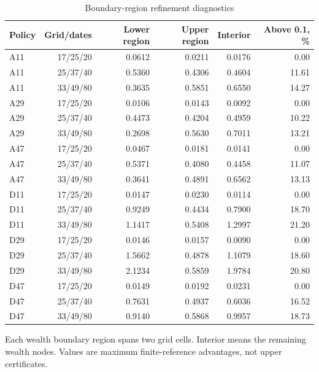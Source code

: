 \begin{table}[htbp]
\centering\small\setlength{\tabcolsep}{4pt}
\caption{Boundary-region refinement diagnostics}\label{tab:r9boundary}
\begin{tabular}{lrrrrr}
\toprule
Policy & Grid/dates & Lower region & Upper region & Interior & Above 0.1, \% \\
\midrule
A11 & 17/25/20 & 0.0612 & 0.0211 & 0.0176 & 0.00 \\
A11 & 25/37/40 & 0.5360 & 0.4306 & 0.4604 & 11.61 \\
A11 & 33/49/80 & 0.3635 & 0.5851 & 0.6550 & 14.27 \\
A29 & 17/25/20 & 0.0106 & 0.0143 & 0.0092 & 0.00 \\
A29 & 25/37/40 & 0.4473 & 0.4204 & 0.4959 & 10.22 \\
A29 & 33/49/80 & 0.2698 & 0.5630 & 0.7011 & 13.21 \\
A47 & 17/25/20 & 0.0467 & 0.0181 & 0.0141 & 0.00 \\
A47 & 25/37/40 & 0.5371 & 0.4080 & 0.4458 & 11.07 \\
A47 & 33/49/80 & 0.3641 & 0.4891 & 0.6562 & 13.13 \\
D11 & 17/25/20 & 0.0147 & 0.0230 & 0.0114 & 0.00 \\
D11 & 25/37/40 & 0.9249 & 0.4434 & 0.7900 & 18.70 \\
D11 & 33/49/80 & 1.1417 & 0.5408 & 1.2997 & 21.20 \\
D29 & 17/25/20 & 0.0146 & 0.0157 & 0.0090 & 0.00 \\
D29 & 25/37/40 & 1.5662 & 0.4878 & 1.1079 & 18.60 \\
D29 & 33/49/80 & 2.1234 & 0.5859 & 1.9784 & 20.80 \\
D47 & 17/25/20 & 0.0149 & 0.0192 & 0.0231 & 0.00 \\
D47 & 25/37/40 & 0.7631 & 0.4937 & 0.6036 & 16.52 \\
D47 & 33/49/80 & 0.9140 & 0.5868 & 0.9957 & 18.73 \\
\bottomrule
\end{tabular}
\par\vspace{3pt}\begin{minipage}{0.97\linewidth}\footnotesize Each wealth boundary region spans two grid cells. Interior means the remaining wealth nodes. Values are maximum finite-reference advantages, not upper certificates.\end{minipage}
\end{table}
